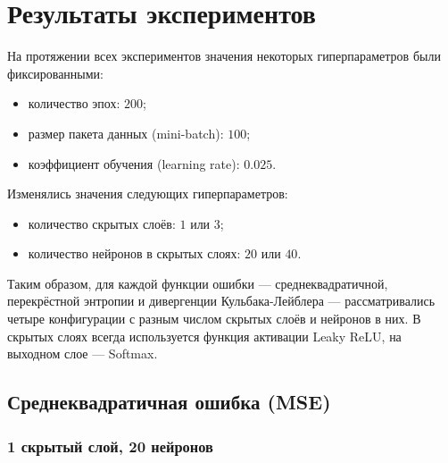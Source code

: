 \documentclass[a4paper, 14pt]{extarticle}
\newenvironment{longlisting}{\captionsetup{type=listing}}{}
\begin{document}
% 
% 
% 

\section{Результаты экспериментов}

На протяжении всех экспериментов значения некоторых гиперпараметров были фиксированными:
\begin{itemize}
  \item количество эпох: $200$;
  \item размер пакета данных (mini-batch): $100$;
  \item коэффициент обучения (learning rate): $0.025$.
\end{itemize}
Изменялись значения следующих гиперпараметров:
\begin{itemize}
  \item количество скрытых слоёв: $1$ или $3$;
  \item количество нейронов в скрытых слоях: $20$ или $40$.
\end{itemize}
Таким образом, для каждой функции ошибки --- среднеквадратичной, перекрёстной энтропии и дивергенции Кульбака-Лейблера --- рассматривались четыре
конфигурации с разным числом скрытых слоёв и нейронов в них. В скрытых слоях всегда используется функция активации Leaky ReLU, на выходном слое ---
Softmax.

\subsection{Среднеквадратичная ошибка (MSE)}

\subsubsection{1 скрытый слой, 20 нейронов}
\end{document}
